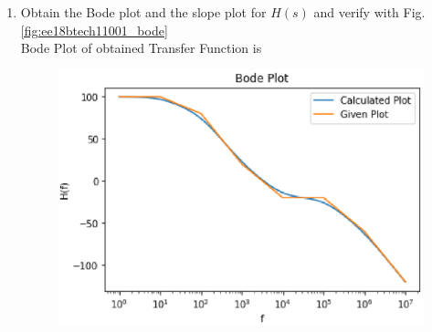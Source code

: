 \begin{enumerate}[label=\thesection.\arabic*.,ref=\thesection.\theenumi]
\item Obtain the Bode plot and the slope plot for $H(s)$ and verify with  Fig. \ref{fig:ee18btech11001_bode}
\\
\solution
Bode Plot of obtained Transfer Function is 
\begin{figure}[htp]
    \centering
    \includegraphics[width=\columnwidth]{./figs/ee18btech11001_2.eps}
    \caption{}
    \label{fig:bode}
\end{figure}

\end{enumerate}
